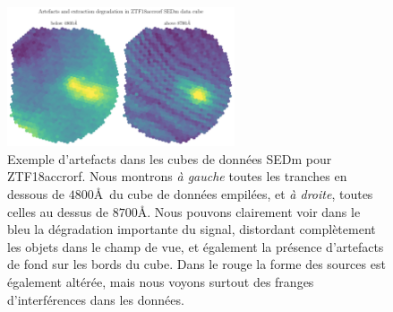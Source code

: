 \documentclass[../main/main.tex]{subfiles}
\begin{document}
\begin{figure}[ht]
  \centering
  \includegraphics[width=0.6\textwidth]{../figures/07_scene/artefactssedmcube.pdf}
  \caption[Exemple d'artefacts dans les cubes de données SEDm.]{Exemple
    d'artefacts dans les cubes de données SEDm pour
    ZTF18accrorf. Nous montrons \emph{à gauche} toutes les tranches en dessous de
    $4800$\AA\ du cube de données empilées, et \emph{à droite}, toutes celles au dessus de
    $8700$\AA. Nous pouvons clairement voir dans le bleu la dégradation
    importante du signal, distordant complètement les objets dans le
    champ de vue, et également la présence d'artefacts de fond sur les
    bords du cube. Dans le rouge la forme des sources est également
    altérée, mais nous voyons surtout des franges d'interférences dans
    les données.}
  \label{fig:artefactssedmcube}
\end{figure}
\end{document}
